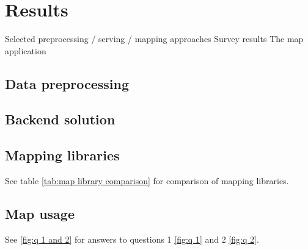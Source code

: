\section{Results}
Selected preprocessing / serving / mapping approaches
Survey results
The map application

\subsection{Data preprocessing}

\subsection{Backend solution}

\subsection{Mapping libraries}


See table \ref{tab:map library comparison} for comparison of mapping libraries.


\subsection{Map usage}

See \ref{fig:q 1 and 2} for answers to questions 1 \ref{fig:q 1} and 2 \ref{fig:q 2}.

